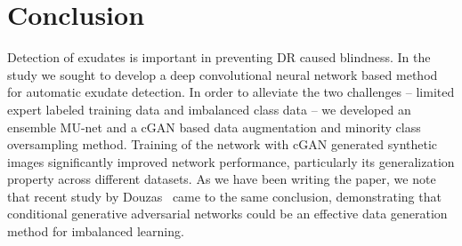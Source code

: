 \documentclass{osa-article}
\begin{document}
\section{Conclusion}
Detection of exudates is important in preventing DR caused blindness. In the study we sought to develop a deep convolutional neural network based method for automatic exudate detection. In order to alleviate the two challenges -- limited expert labeled training data and imbalanced class data -- we developed an ensemble MU-net and a cGAN based data augmentation and minority class oversampling method. Training of the network with cGAN generated synthetic images significantly improved network performance, particularly its generalization property across different datasets. As we have been writing the paper, we note that recent study by Douzas~\cite{Douzas:2018ka} came to the same conclusion, demonstrating that conditional generative adversarial networks could be an effective data generation method for imbalanced learning.


\end{document}

